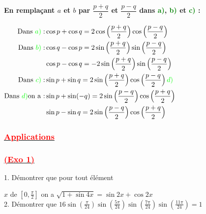 \documentclass[a4paper,12pt]{article}
\begin{document}
\noindent\textbf{En remplaçant \( a \) et \( b \) par \( \dfrac{p+q}{2} \) et \( \dfrac{p-q}{2} \) dans \textcolor{green}{a)}, \textcolor{green}{b)} et \textcolor{green}{c)} :}

\medskip

\(
\begin{aligned}
    \text{Dans } \textcolor{green}{a)}:               &
    \cos p + \cos q = 2 \cos\left( \dfrac{p+q}{2} \right) \cos\left( \dfrac{p-q}{2} \right)                                                         \\
    \text{Dans } \textcolor{green}{b)}:               & \cos q - \cos p = 2 \sin\left( \dfrac{p+q}{2} \right) \sin\left( \dfrac{p-q}{2} \right)     \\
                                                      & \cos p - \cos q = -2 \sin\left( \dfrac{p+q}{2} \right) \sin\left( \dfrac{p-q}{2} \right)    \\
    \text{Dans } \textcolor{green}{c)}:               &
    \sin p + \sin q = 2 \sin\left( \dfrac{p+q}{2} \right) \cos\left( \dfrac{p-q}{2} \right) \textcolor{green}{d)}                                   \\
    \text{Dans } \textcolor{green}{ d)} \text{on a :} &
    \sin p + \sin(-q) = 2 \sin\left( \dfrac{p-q}{2} \right) \cos\left( \dfrac{p+q}{2} \right)                                                       \\
                                                      & \sin p - \sin q = 2 \sin\left( \dfrac{p - q}{2} \right) \cos\left( \dfrac{p + q}{2} \right)
\end{aligned}
\)

\subsubsection*{\underline{\textcolor{red}{Applications}}}

\noindent
\subsubsection*{\underline{\textcolor{red}{ (Exo 1)}}}

1. Démontrer que pour tout élément

$x$ de $\left[0, \frac{\pi}{2}\right]$ on a $\sqrt{1 + \sin 4x} = \sin 2x + \cos 2x$\\

2. Démontrer que
\(16\sin\left(\frac{\pi}{24}\right) \sin\left(\frac{5\pi}{24}\right) \sin\left(\frac{7\pi}{24}\right) \sin\left(\frac{11\pi}{24}\right) = 1\)
\end{document}

